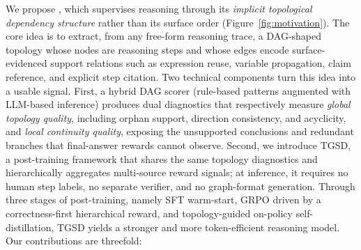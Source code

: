 We propose \textsc{\method}, which supervises reasoning through its \emph{implicit topological dependency structure} rather than its surface order (Figure~\ref{fig:motivation}). The core idea is to extract, from any free-form reasoning trace, a DAG-shaped topology whose nodes are reasoning steps and whose edges encode surface-evidenced support relations such as expression reuse, variable propagation, claim reference, and explicit step citation. Two technical components turn this idea into a usable signal. First, a hybrid DAG scorer (rule-based patterns augmented with LLM-based inference) produces dual diagnostics that respectively measure \emph{global topology quality}, including orphan support, direction consistency, and acyclicity, and \emph{local continuity quality}, exposing the unsupported conclusions and redundant branches that final-answer rewards cannot observe. Second, we introduce \textsc{TGSD}, a post-training framework that shares the same topology diagnostics and hierarchically aggregates multi-source reward signals; at inference, it requires no human step labels, no separate verifier, and no graph-format generation. Through three stages of post-training, namely SFT warm-start, GRPO driven by a correctness-first hierarchical reward, and topology-guided on-policy self-distillation, \textsc{TGSD} yields a stronger and more token-efficient reasoning model.
Our contributions are threefold:
